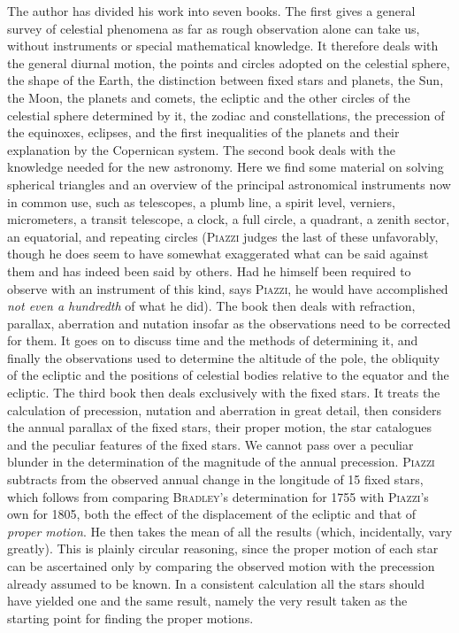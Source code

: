 The author has divided his work into seven books. The first gives a general survey of celestial phenomena as far as rough observation alone can take us, without instruments or special mathematical knowledge. It therefore deals with the general diurnal motion, the points and circles adopted on the celestial sphere, the shape of the Earth, the distinction between fixed stars and planets, the Sun, the Moon, the planets and comets, the ecliptic and the other circles of the celestial sphere determined by it, the zodiac and constellations, the precession of the equinoxes, eclipses, and the first inequalities of the planets and their explanation by the Copernican system. The second book deals with the knowledge needed for the new astronomy. Here we find some material on solving spherical triangles and an overview of the principal astronomical instruments now in common use, such as telescopes, a plumb line, a spirit level, verniers, micrometers, a transit telescope, a clock, a full circle, a quadrant, a zenith sector, an equatorial, and repeating circles (\textsc{Piazzi} judges the last of these unfavorably, though he does seem to have somewhat exaggerated what can be said against them and has indeed been said by others. Had he himself been required to observe with an instrument of this kind, says \textsc{Piazzi}, he would have accomplished \emph{not even a hundredth} of what he did). The book then deals with refraction, parallax, aberration and nutation insofar as the observations need to be corrected for them. It goes on to discuss time and the methods of determining it, and finally the observations used to determine the altitude of the pole, the obliquity of the ecliptic and the positions of celestial bodies relative to the equator and the ecliptic. The third book then deals exclusively with the fixed stars. It treats the calculation of precession, nutation and aberration in great detail, then considers the annual parallax of the fixed stars, their proper motion, the star catalogues and the peculiar features of the fixed stars. We cannot pass over a peculiar blunder in the determination of the magnitude of the annual precession. \textsc{Piazzi} subtracts from the observed annual change in the longitude of 15 fixed stars, which follows from comparing \textsc{Bradley}'s determination for 1755 with \textsc{Piazzi}'s own for 1805, both the effect of the displacement of the ecliptic and that of \emph{proper motion}. He then takes the mean of all the results (which, incidentally, vary greatly). This is plainly circular reasoning, since the proper motion of each star can be ascertained only by comparing the observed motion with the precession already assumed to be known. In a consistent calculation all the stars should have yielded one and the same result, namely the very result taken as the starting point for finding the proper motions.

